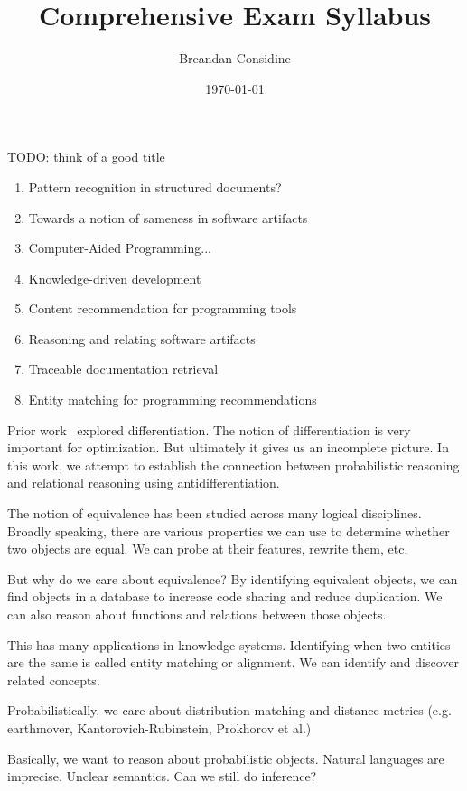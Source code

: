\documentclass[11pt]{article}
\title{Comprehensive Exam Syllabus}
\author{Breandan Considine}
\date{\today}
\begin{document}
    \maketitle

    \tableofcontents

    TODO: think of a good title

    \begin{enumerate}
      \item Pattern recognition in structured documents?
      \item Towards a notion of sameness in software artifacts
      \item Computer-Aided Programming...
      \item Knowledge-driven development
      \item Content recommendation for programming tools
      \item Reasoning and relating software artifacts
      \item Traceable documentation retrieval
      \item Entity matching for programming recommendations
    \end{enumerate}

    Prior work~\citep{considine2019kotlingrad,considine2019programming} explored differentiation. The notion of differentiation is very important for optimization. But ultimately it gives us an incomplete picture. In this work, we attempt to establish the connection between probabilistic reasoning and relational reasoning using antidifferentiation.

    The notion of equivalence has been studied across many logical disciplines. Broadly speaking, there are various properties we can use to determine whether two objects are equal. We can probe at their features, rewrite them, etc.

    But why do we care about equivalence? By identifying equivalent objects, we can find objects in a database to increase code sharing and reduce duplication. We can also reason about functions and relations between those objects.

    This has many applications in knowledge systems. Identifying when two entities are the same is called entity matching or alignment. We can identify and discover related concepts.

    Probabilistically, we care about distribution matching and distance metrics (e.g. earthmover, Kantorovich-Rubinstein, Prokhorov et al.)


    Basically, we want to reason about probabilistic objects. Natural languages are imprecise. Unclear semantics. Can we still do inference?
\end{document}
